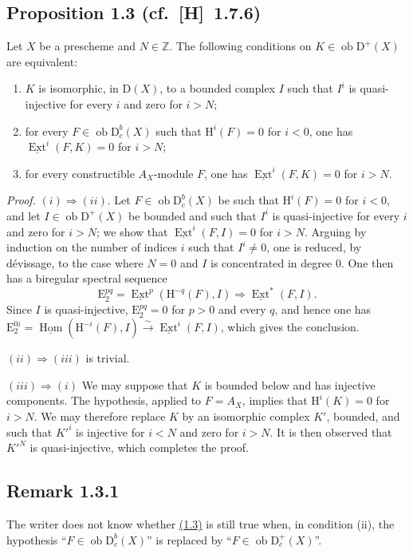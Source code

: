 \documentclass[11pt]{article}
\renewcommand{\H}{\mathrm{H}}
\DeclareMathOperator{\Hom}{Hom}
\DeclareMathOperator{\Ext}{Ext}
\newcommand{\D}{\mathrm{D}}
\newcommand{\Z}{\mathbb{Z}}
\newcommand{\E}{\mathrm{E}}
\newcommand{\ob}{\operatorname{ob}}
\providecommand{\Hom}{\operatorname{Hom}}
\providecommand{\ob}{\operatorname{ob}}
\providecommand{\Z}{\mathbb Z}
\providecommand{\Hom}{\operatorname{Hom}}
\begin{document}
\subsection*{Proposition 1.3 {\normalfont (cf.~[H]~1.7.6)}}\label{sga5:I:proposition:1.3}
Let $X$ be a prescheme and $N \in \Z$. The following conditions on $K \in \ob \D^{+}(X)$ are equivalent:
\begin{enumerate}[label=(\roman*)]
\item $K$ is isomorphic, in $\D(X)$, to a bounded complex $I$ such that $I^i$ is quasi-injective for every $i$ and zero for $i > N$;
\item for every $F \in \ob \D_c^{b}(X)$ such that $\H^i(F) = 0$ for $i < 0$, one has $\underline{\Ext}^i(F,K) = 0$ for $i > N$;
\item for every constructible $A_X$-module $F$, one has $\underline{\Ext}^i(F,K) = 0$ for $i > N$.
\end{enumerate}

\emph{Proof.} $(i) \Rightarrow (ii)$. Let $F \in \ob \D_c^{b}(X)$ be such that $\H^i(F) = 0$ for $i < 0$, and let $I \in \ob \D^{+}(X)$ be bounded and such that $I^i$ is quasi-injective for every $i$ and zero for $i > N$; we show that $\underline{\Ext}^i(F,I) = 0$ for $i > N$. Arguing by induction on the number of indices $i$ such that $I^i \neq 0$, one is reduced, by dévissage, to the case where $N = 0$ and $I$ is concentrated in degree $0$. One then has a biregular spectral sequence
\[
\E_2^{pq} = \underline{\Ext}^p(\H^{-q}(F),I) \Rightarrow \underline{\Ext}^{*}(F,I).
\]
Since $I$ is quasi-injective, $\E_2^{pq} = 0$ for $p > 0$ and every $q$, and hence one has $\E_2^{0i} = \underline{\Hom}(\H^{-i}(F),I) \xrightarrow{\sim} \underline{\Ext}^i(F,I)$, which gives the conclusion.

$(ii) \Rightarrow (iii)$ is trivial.

$(iii) \Rightarrow (i)$ We may suppose that $K$ is bounded below and has injective components. The hypothesis, applied to $F = A_X$, implies that $\H^i(K) = 0$ for $i > N$. We may therefore replace $K$ by an isomorphic complex $K'$, bounded, and such that $K'^i$ is injective for $i < N$ and zero for $i > N$. It is then observed that $K'^N$ is quasi-injective, which completes the proof.

\subsection*{Remark 1.3.1}\label{sga5:I:remark:1.3.1}
The writer does not know whether \hyperref[sga5:I:proposition:1.3]{(1.3)} is still true when, in condition (ii), the hypothesis ``$F \in \ob \D_c^{b}(X)$'' is replaced by ``$F \in \ob \D_c^{+}(X)$''.
\end{document}

